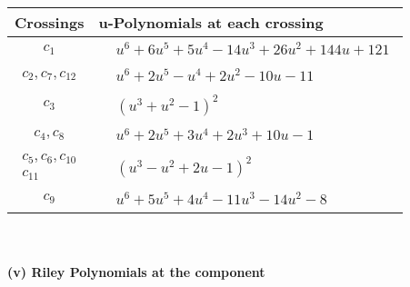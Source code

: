 \documentclass[1p]{elsarticle_modified}
\theoremstyle{definition}
\begin{document}
\begin{tabular}{m{50pt}|m{274pt}}
Crossings & \hspace{64pt}u-Polynomials at each crossing \\
\hline $$\begin{aligned}c_{1}\end{aligned}$$&$\begin{aligned}
&u^6+6 u^5+5 u^4-14 u^3+26 u^2+144 u+121
\end{aligned}$\\
\hline $$\begin{aligned}c_{2},c_{7},c_{12}\end{aligned}$$&$\begin{aligned}
&u^6+2 u^5- u^4+2 u^2-10 u-11
\end{aligned}$\\
\hline $$\begin{aligned}c_{3}\end{aligned}$$&$\begin{aligned}
&(u^3+u^2-1)^2
\end{aligned}$\\
\hline $$\begin{aligned}c_{4},c_{8}\end{aligned}$$&$\begin{aligned}
&u^6+2 u^5+3 u^4+2 u^3+10 u-1
\end{aligned}$\\
\hline $$\begin{aligned}c_{5},c_{6},c_{10}\\c_{11}\end{aligned}$$&$\begin{aligned}
&(u^3- u^2+2 u-1)^2
\end{aligned}$\\
\hline $$\begin{aligned}c_{9}\end{aligned}$$&$\begin{aligned}
&u^6+5 u^5+4 u^4-11 u^3-14 u^2-8
\end{aligned}$\\
\hline
\end{tabular}\\~\\
\newpage\renewcommand{\arraystretch}{1}
\flushleft \textbf{(v) Riley Polynomials at the component}\newline \\
\end{document}
